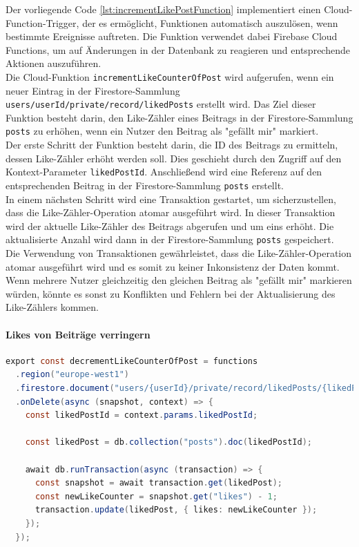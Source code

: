 Der vorliegende Code \ref{lst:incrementLikePostFunction} implementiert einen Cloud-Function-Trigger, der es ermöglicht, Funktionen automatisch auszulösen, wenn bestimmte Ereignisse auftreten. Die Funktion verwendet dabei Firebase Cloud Functions, um auf Änderungen in der Datenbank zu reagieren und entsprechende Aktionen auszuführen.
\\
Die Cloud-Funktion \texttt{incrementLikeCounterOfPost} wird aufgerufen, wenn ein neuer Eintrag in der Firestore-Sammlung \texttt{users/{userId}/private/record/likedPosts} erstellt wird. Das Ziel dieser Funktion besteht darin, den Like-Zähler eines Beitrags in der Firestore-Sammlung \texttt{posts} zu erhöhen, wenn ein Nutzer den Beitrag als "gefällt mir" markiert.
\\
Der erste Schritt der Funktion besteht darin, die ID des Beitrags zu ermitteln, dessen Like-Zähler erhöht werden soll. Dies geschieht durch den Zugriff auf den Kontext-Parameter \texttt{likedPostId}. Anschließend wird eine Referenz auf den entsprechenden Beitrag in der Firestore-Sammlung \texttt{posts} erstellt.
\\
In einem nächsten Schritt wird eine Transaktion gestartet, um sicherzustellen, dass die Like-Zähler-Operation atomar ausgeführt wird. In dieser Transaktion wird der aktuelle Like-Zähler des Beitrags abgerufen und um eins erhöht. Die aktualisierte Anzahl wird dann in der Firestore-Sammlung \texttt{posts} gespeichert.
\\
Die Verwendung von Transaktionen gewährleistet, dass die Like-Zähler-Operation atomar ausgeführt wird und es somit zu keiner Inkonsistenz der Daten kommt. Wenn mehrere Nutzer gleichzeitig den gleichen Beitrag als "gefällt mir" markieren würden, könnte es sonst zu Konflikten und Fehlern bei der Aktualisierung des Like-Zählers kommen.

\paragraph{Likes von Beiträge verringern}

\begin{lstlisting}[language=Java,caption=decrementLikeCounterOfPost Funktion,label=lst:decrementLikePostFunction]
  export const decrementLikeCounterOfPost = functions
  .region("europe-west1")
  .firestore.document("users/{userId}/private/record/likedPosts/{likedPostId}")
  .onDelete(async (snapshot, context) => {
    const likedPostId = context.params.likedPostId;

    const likedPost = db.collection("posts").doc(likedPostId);

    await db.runTransaction(async (transaction) => {
      const snapshot = await transaction.get(likedPost);
      const newLikeCounter = snapshot.get("likes") - 1;
      transaction.update(likedPost, { likes: newLikeCounter });
    });
  });
\end{lstlisting}

